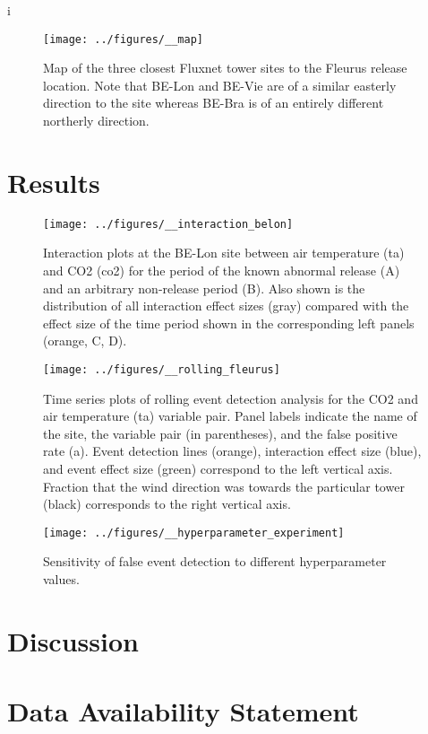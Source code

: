 i\documentclass{article}
\begin{document}
\begin{figure}
	\centering
	\texttt{[image: ../figures/\_\_map]}
	\caption{Map of the three closest Fluxnet tower sites to the Fleurus release location. Note that BE-Lon and BE-Vie are of a similar easterly direction to the site whereas BE-Bra is of an entirely different northerly direction.}
	\label{fig:study_site}
\end{figure}

\section{Results}

\begin{figure}
	\centering
	\texttt{[image: ../figures/\_\_interaction\_belon]}
	\caption{Interaction plots at the BE-Lon site between air temperature (ta) and CO2 (co2) for the period of the known abnormal release (A) and an arbitrary non-release period (B). Also shown is the distribution of all interaction effect sizes (gray) compared with the effect size of the time period shown in the corresponding left panels (orange, C, D).}
	\label{fig:interaction}
\end{figure}


\begin{figure}
	\centering
	\texttt{[image: ../figures/\_\_rolling\_fleurus]}
	\caption{Time series plots of rolling event detection analysis for the CO2 and air temperature (ta) variable pair. Panel labels indicate the name of the site, the variable pair (in parentheses), and the false positive rate (a). Event detection lines (orange), interaction effect size (blue), and event effect size (green) correspond to the left vertical axis. Fraction that the wind direction was towards the particular tower (black) corresponds to the right vertical axis.}
	\label{fig:rolling}
\end{figure}

\begin{figure}
	\centering
	\texttt{[image: ../figures/\_\_hyperparameter\_experiment]}
	\caption{Sensitivity of false event detection to different hyperparameter values.}
	\label{fig:hyperparameter}
\end{figure}

\section{Discussion}

\section{Data Availability Statement}
\end{document}
